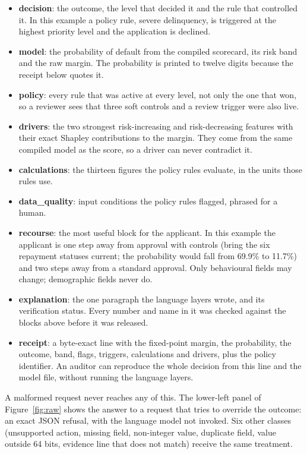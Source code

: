 \documentclass[twocolumn,10pt]{article}
\begin{document}
\begin{itemize}\setlength\itemsep{1pt}
\item \textbf{decision}: the outcome, the level that decided it and the rule that controlled it. In this example a policy rule,
  severe delinquency, is triggered at the highest priority level and the application is declined.
\item \textbf{model}: the probability of default from the compiled scorecard, its risk band and the raw margin. The
  probability is printed to twelve digits because the receipt below quotes it.
\item \textbf{policy}: every rule that was active at every level, not only the one that won, so a reviewer sees that
  three soft controls and a review trigger were also live.
\item \textbf{drivers}: the two strongest risk-increasing and risk-decreasing features with their exact Shapley
  contributions to the margin. They come from the same compiled model as the score, so a driver can never contradict it.
\item \textbf{calculations}: the thirteen figures the policy rules evaluate, in the units those rules use.
\item \textbf{data\_quality}: input conditions the policy rules flagged, phrased for a human.
\item \textbf{recourse}: the most useful block for the applicant. In this example the applicant is one step away from approval with controls
  (bring the six repayment statuses current; the probability would fall from 69.9\% to 11.7\%) and two steps away from a
  standard approval. Only behavioural fields may change; demographic fields never do.
\item \textbf{explanation}: the one paragraph the language layers wrote, and its verification status. Every number and
  name in it was checked against the blocks above before it was released.
\item \textbf{receipt}: a byte-exact line with the fixed-point margin, the probability, the outcome, band, flags,
  triggers, calculations and drivers, plus the policy identifier. An auditor can reproduce the whole decision from this
  line and the model file, without running the language layers.
\end{itemize}

A malformed request never reaches any of this. The lower-left panel of Figure~\ref{fig:raw} shows the answer to a request
that tries to override the outcome: an exact JSON refusal, with the language model not invoked. Six other classes
(unsupported action, missing field, non-integer value, duplicate field, value outside 64 bits, evidence line that does
not match) receive the same treatment.
\end{document}
